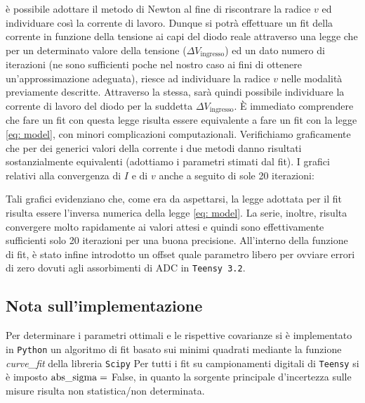 \documentclass{article}[a4paper, oneside, 11pt]
\begin{document}
\`e possibile adottare il metodo di Newton al fine di riscontrare la radice $v$
ed individuare cos\`i la corrente di lavoro. 
Dunque si potr\`a effettuare un fit della corrente in funzione della tensione ai 
capi del diodo reale attraverso una legge che per un determinato valore della 
tensione ($\Delta V_{\text{ingresso}}$) ed un dato numero di iterazioni (ne 
sono sufficienti poche nel nostro caso ai fini di ottenere un’approssimazione 
adeguata), riesce ad individuare la radice $v$ nelle modalit\`a previamente 
descritte. Attraverso la stessa, sar\`a quindi possibile individuare la corrente 
di lavoro del diodo per la suddetta $\Delta V_{\text{ingresso}}$. 
\`E immediato comprendere che fare un fit con questa legge risulta essere 
equivalente a fare un fit con la legge \eqref{eq: model}, con minori complicazioni 
computazionali. Verifichiamo graficamente che per dei generici valori della 
corrente i due metodi danno risultati sostanzialmente equivalenti (adottiamo i 
parametri stimati dal fit). I grafici relativi alla convergenza di $I$ e di $v$ 
anche a seguito di sole 20 iterazioni:
\begin{figure}[H]
	\centering 
	\def\svgwidth{\columnwidth}
		\scalebox{0.75}{}
\end{figure}
\begin{figure}[H]
	\centering 
		\scalebox{0.75}{}
\end{figure}
Tali grafici evidenziano che, come era da aspettarsi, la legge adottata per il 
fit risulta essere l’inversa numerica della legge \eqref{eq: model}. La serie,
inoltre, risulta convergere molto rapidamente ai valori attesi e quindi sono 
effettivamente sufficienti solo 20 iterazioni per una buona precisione.
All’interno della funzione di fit, \`e stato infine introdotto un offset quale
parametro libero per ovviare errori di zero dovuti agli assorbimenti di ADC
in \verb+Teensy 3.2+.

\subsection{Nota sull'implementazione}
Per determinare i parametri ottimali e le rispettive covarianze si \`e
implementato in \verb+Python+ un algoritmo di fit basato sui minimi quadrati
mediante la funzione \emph{curve\_fit} della libreria \texttt{Scipy}\cite{scipy}
Per tutti i fit su campionamenti digitali di \verb+Teensy+ si \`e imposto
$\rm{abs\_sigma} =$ False, in quanto la sorgente principale d'incertezza
sulle misure risulta non statistica/non determinata.

\medskip


\end{document}
